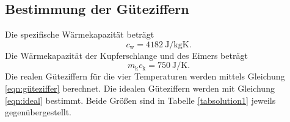 \subsection{Bestimmung der Güteziffern}
Die spezifische Wärmekapazität \cite{wiki} beträgt
\begin{equation*}
    c_\text{w} = \SI{4182}{\joule\per\kilo\gram\kelvin}.
\end{equation*}
Die Wärmekapazität der Kupferschlange und des Eimers beträgt
\begin{equation*}
    m_\text{k} c_\text{k} = \SI{750}{\joule\per\kelvin}.
\end{equation*}
Die realen Güteziffern für die vier Temperaturen werden mittels
Gleichung \eqref{eqn:güteziffer} berechnet.
Die idealen Güteziffern werden mit Gleichung \eqref{eqn:ideal}
bestimmt.
Beide Größen sind in Tabelle \ref{tabsolution1} jeweils
gegenübergestellt.


